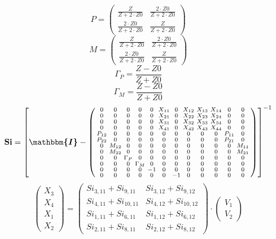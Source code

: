 \[ P=\left(\begin{smallmatrix} \frac{Z}{Z+2\cdot Z0} & \frac{2\cdot
Z0}{Z+2\cdot Z0} \\ \frac{2\cdot Z0}{Z+2\cdot Z0} & \frac{Z}{Z+2\cdot
Z0} \end{smallmatrix}\right) \]
\[ M=\left(\begin{smallmatrix} \frac{Z}{Z+2\cdot Z0} & \frac{2\cdot
Z0}{Z+2\cdot Z0} \\ \frac{2\cdot Z0}{Z+2\cdot Z0} & \frac{Z}{Z+2\cdot
Z0} \end{smallmatrix}\right) \]
\[ \Gamma_P=\frac{ Z -Z0}{ Z +Z0} \]
\[ \Gamma_M=\frac{ Z -Z0}{ Z +Z0} \]
\[ \mathbf{Si} = \left[ \boldsymbol{\mathbbm{I}}  -
\left(\begin{smallmatrix} 0 & 0 & 0 & 0 & 0 & X_{11} & 0 & X_{12} &
X_{13} & X_{14} & 0 & 0 \\ 0 & 0 & 0 & 0 & 0 & X_{21} & 0 & X_{22} &
X_{23} & X_{24} & 0 & 0 \\ 0 & 0 & 0 & 0 & 0 & X_{31} & 0 & X_{32} &
X_{33} & X_{34} & 0 & 0 \\ 0 & 0 & 0 & 0 & 0 & X_{41} & 0 & X_{42} &
X_{43} & X_{44} & 0 & 0 \\ P_{12} & 0 & 0 & 0 & 0 & 0 & 0 & 0 & 0 & 0
& P_{11} & 0 \\ P_{22} & 0 & 0 & 0 & 0 & 0 & 0 & 0 & 0 & 0 & P_{21} &
0 \\ 0 & M_{12} & 0 & 0 & 0 & 0 & 0 & 0 & 0 & 0 & 0 & M_{11} \\ 0 &
M_{22} & 0 & 0 & 0 & 0 & 0 & 0 & 0 & 0 & 0 & M_{21} \\ 0 & 0 &
\Gamma_P & 0 & 0 & 0 & 0 & 0 & 0 & 0 & 0 & 0 \\ 0 & 0 & 0 & \Gamma_M &
0 & 0 & 0 & 0 & 0 & 0 & 0 & 0 \\ 0 & 0 & 0 & 0 & -1 & 0 & 0 & 0 & 0 &
0 & 0 & 0 \\ 0 & 0 & 0 & 0 & 0 & 0 & -1 & 0 & 0 & 0 & 0 & 0
\end{smallmatrix}\right) \right]^{-1} \]
\[ \left(\begin{array}{c} X_{3} \\ X_{4} \\ X_{1} \\ X_{2}
\end{array}\right)=\left(\begin{smallmatrix} Si_{3,11} + Si_{9,11} &
Si_{3,12} + Si_{9,12} \\ Si_{4,11} + Si_{10,11} & Si_{4,12} +
Si_{10,12} \\ Si_{1,11} + Si_{6,11} & Si_{1,12} + Si_{6,12} \\
Si_{2,11} + Si_{8,11} & Si_{2,12} + Si_{8,12}
\end{smallmatrix}\right)\cdot \left(\begin{array}{c} V_{1} \\ V_{2}
\end{array}\right) \]

